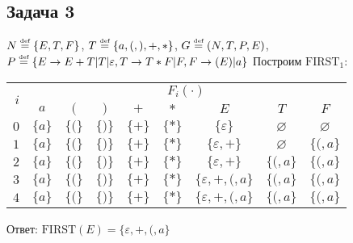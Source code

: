 \documentclass[a4paper]{article}
\def\eqdef{\overset{\mbox{\tiny def}}{=}}
\def\first{\mathrm{ FIRST} }
\begin{document}
\subsection*{Задача 3}
$N\eqdef\{E,T,F\}$, $T\eqdef\{a,(,),+,*\}$, $G\eqdef(N,T,P,E)$, $P\eqdef\{E\to E+T|T|\varepsilon,T \to T*F|F,F\to (E)|a\}$\newline
Построим $\first_1$:\newline
\begin{tabular}{|r|c|c|c|c|c|c|c|c|}
\hline
\multirow{2}{*}{$i$} & \multicolumn{8}{c|}{$F_i(\cdot)$}\\\cline{2-9}
& $a$ & $($ & $)$ & $+$ & $*$ & $E$ & $T$ & $F$\\\hline
$0$ & $\{a\}$ & $\{(\}$ & $\{)\}$ & $\{+\}$ & $\{*\}$ & $\{\varepsilon\}$ & $\varnothing$ & $\varnothing$\\\hline
$1$ & $\{a\}$ & $\{(\}$ & $\{)\}$ & $\{+\}$ & $\{*\}$ & $\{\varepsilon,+\}$ & $\varnothing$ & $\{(,a\}$\\\hline
$2$ & $\{a\}$ & $\{(\}$ & $\{)\}$ & $\{+\}$ & $\{*\}$ & $\{\varepsilon,+\}$ & $\{(,a\}$ & $\{(,a\}$\\\hline
$3$ & $\{a\}$ & $\{(\}$ & $\{)\}$ & $\{+\}$ & $\{*\}$ & $\{\varepsilon,+,(,a\}$ & $\{(,a\}$ & $\{(,a\}$\\\hline
$4$ & $\{a\}$ & $\{(\}$ & $\{)\}$ & $\{+\}$ & $\{*\}$ & $\{\varepsilon,+,(,a\}$ & $\{(,a\}$ & $\{(,a\}$\\\hline
\end{tabular}\newline
Ответ: $\boxed{\first(E)=\{\varepsilon,+,(,a\}}$
\end{document}
